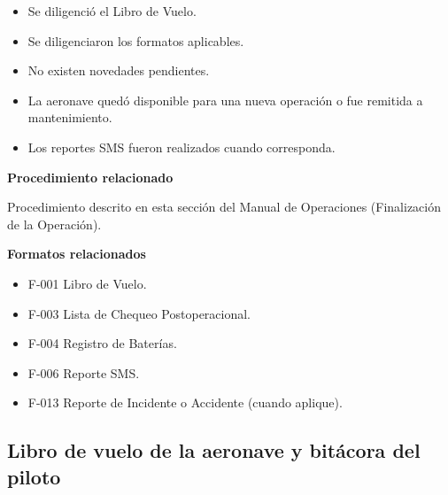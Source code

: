 \begin{itemize}

\item Se diligenció el Libro de Vuelo.

\item Se diligenciaron los formatos aplicables.

\item No existen novedades pendientes.

\item La aeronave quedó disponible para una nueva operación o fue remitida a mantenimiento.

\item Los reportes SMS fueron realizados cuando corresponda.

\end{itemize}


\begin{tcolorbox}[title=Documentos asociados,colback=gray!5,colframe=black]

\textbf{Procedimiento relacionado}

Procedimiento descrito en esta sección del Manual de Operaciones (Finalización de la Operación).

\vspace{0.3cm}

\textbf{Formatos relacionados}

\begin{itemize}

\item F-001 Libro de Vuelo.

\item F-003 Lista de Chequeo Postoperacional.

\item F-004 Registro de Baterías.

\item F-006 Reporte SMS.

\item F-013 Reporte de Incidente o Accidente (cuando aplique).

\end{itemize}

\end{tcolorbox}



\subsection{Libro de vuelo de la aeronave y bitácora del piloto}

